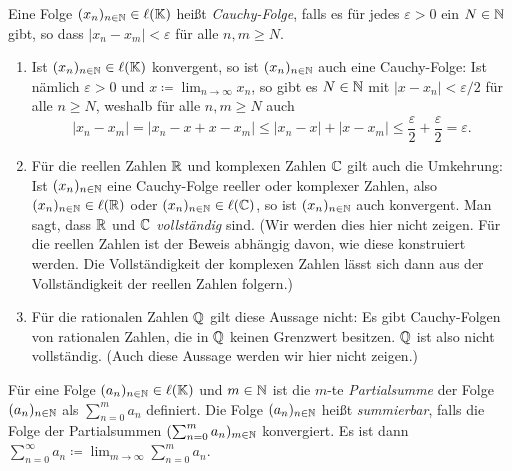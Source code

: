 \begin{defi}
 Eine Folge $(x_n)_{n \in \mathbb{N}} \in \ell(\mathbb{K})$ heißt \emph{Cauchy-Folge}, falls es für jedes $\varepsilon > 0$ ein $N \in \mathbb{N}$ gibt, so dass $|x_n - x_m| < \varepsilon$ für alle $n,m \geq N$.
\end{defi}


\begin{bem}
 \begin{enumerate}[leftmargin=*]
  \item
   Ist $(x_n)_{n \in \mathbb{N}} \in \ell(\mathbb{K})$ konvergent, so ist $(x_n)_{n \in \mathbb{N}}$ auch eine Cauchy-Folge: Ist nämlich $\varepsilon > 0$ und $x \coloneqq \lim_{n \to \infty} x_n$, so gibt es $N \in \mathbb{N}$ mit $|x - x_n| < \varepsilon/2$ für alle $n \geq N$, weshalb für alle $n,m \geq N$ auch
   \[
    |x_n - x_m|
    = |x_n - x + x - x_m|
    \leq |x_n - x| + |x - x_m|
    \leq \frac{\varepsilon}{2} + \frac{\varepsilon}{2}
    = \varepsilon.
   \]
  \item
   Für die reellen Zahlen $\mathbb{R}$ und komplexen Zahlen $\mathbb{C}$ gilt auch die Umkehrung: Ist $(x_n)_{n \in \mathbb{N}}$ eine Cauchy-Folge reeller oder komplexer Zahlen, also $(x_n)_{n \in \mathbb{N}} \in \ell(\mathbb{R})$ oder $(x_n)_{n \in \mathbb{N}} \in \ell(\mathbb{C})$, so ist $(x_n)_{n \in \mathbb{N}}$ auch konvergent. Man sagt, dass $\mathbb{R}$ und $\mathbb{C}$ \emph{vollständig} sind. (Wir werden dies hier nicht zeigen. Für die reellen Zahlen ist der Beweis abhängig davon, wie diese konstruiert werden. Die Vollständigkeit der komplexen Zahlen lässt sich dann aus der Vollständigkeit der reellen Zahlen folgern.)
  \item
   Für die rationalen Zahlen $\mathbb{Q}$ gilt diese Aussage nicht: Es gibt Cauchy-Folgen von rationalen Zahlen, die in $\mathbb{Q}$ keinen Grenzwert besitzen. $\mathbb{Q}$ ist also nicht vollständig. (Auch diese Aussage werden wir hier nicht zeigen.)
 \end{enumerate}
\end{bem}


\begin{defi}
 Für eine Folge $(a_n)_{n \in \mathbb{N}} \in \ell(\mathbb{K})$ und $m \in \mathbb{N}$ ist die $m$-te \emph{Partialsumme} der Folge $(a_n)_{n \in \mathbb{N}}$ als $\sum_{n=0}^m a_n$ definiert. Die Folge $(a_n)_{n \in \mathbb{N}}$ heißt \emph{summierbar}, falls die Folge der Partialsummen $(\sum_{n=0}^m a_n)_{m \in \mathbb{N}}$ konvergiert. Es ist dann $\sum_{n=0}^\infty a_n \coloneqq \lim_{m \to \infty} \sum_{n=0}^m a_n$.
\end{defi}


